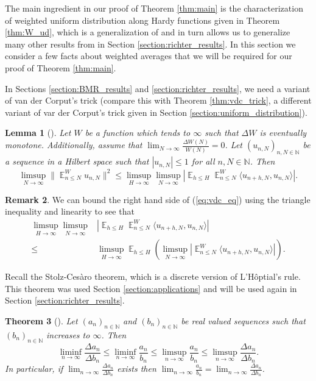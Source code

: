 \documentclass[12pt]{article}
\theoremstyle{plain} %
\newtheorem{theorem}{Theorem}[section]
\newtheorem{lemma}[theorem]{Lemma}
\theoremstyle{definition} %
\newtheorem{remark}[theorem]{Remark}
\theoremstyle{plain}
\theoremstyle{plain}
\numberwithin{equation}{section}
\newcommand{\Cesaro}{Ces\`{a}ro }
\newcommand{\N}{\mathbb{N}}
\renewcommand{\leq}{\leqslant}
\newcommand{\1}{\mathbbm{1}}
\newcommand{\E}{\operatorname{\mathbb{E}}}
\newcommand{\oo}{\infty}
\begin{document}
The main ingredient in our proof of Theorem \ref{thm:main} is the  characterization of weighted uniform distribution along Hardy functions given in Theorem \ref{thm:W_ud}, which is a generalization of \cite[Theorem 5.1]{Richter23} and in turn allows us to generalize many other results from \cite{Richter23} in Section \ref{section:richter_results}. In this section we consider a few facts about weighted averages that we will be required for our proof of Theorem \ref{thm:main}.


In Sections \ref{section:BMR_results} and \ref{section:richter_results}, we need a variant of van der Corput's trick (compare this with Theorem \ref{thm:vdc_trick}, a different variant of var der Corput's trick given in Section \ref{section:uniform_distribution}).

\begin{lemma}[{\cite[Lemma 4.6]{BMR24}}]\label{lem:vdc}
Let $W$ be a function which tends to $\oo$ such that $\Delta W$ is eventually monotone. Additionally, assume that $\lim_{N\to\oo}\frac{\Delta W(N)}{W(N)}=0$. Let $(u_{n,N})_{n,N\in \N}$ be a sequence in a Hilbert space such that $|u_{n,N}|\leq 1$ for all $n,N\in \N$. Then
\begin{equation}\label{eq:vdc_eq}
    \limsup_{N\to\oo}\|\E_{n\leq N}^Wu_{n,N}\|^2 \leq \limsup_{H\to\oo}\limsup_{N\to\oo}\left|\E_{h\leq H}\E_{n\leq N}^W\langle u_{n+h,N},u_{n,N}\rangle\right|.
\end{equation}

\end{lemma}
\begin{remark}\label{remark:vdc}
    We can bound the right hand side of (\ref{eq:vdc_eq}) using the triangle inequality and linearity to see that
\begin{align*}\label{eq:vdc_eq_2}
\limsup_{H\to\oo}\limsup_{N\to\oo}&\left|\E_{h\leq H}\E_{n\leq N}^W\langle u_{n+h,N},u_{n,N}\rangle\right|\\\leq& \limsup_{H\to\oo}\E_{h\leq H}\left(\limsup_{N\to\oo}\left|\E_{n\leq N}^W\langle u_{n+h,N},u_{n,N}\rangle\right|\right).
\end{align*}
\end{remark}

Recall the Stolz-\Cesaro theorem, which is a discrete version of L'H\^optial's rule. This theorem was used Section \ref{section:applications} and will be used again in Section \ref{section:richter_results}. 
\begin{theorem}[{\cite[Problem 70]{Polya_Szego}}]\label{thm:stolz_cesaro}
Let $(a_n)_{n\in \N}$ and $(b_n)_{n\in \N}$ be real valued sequences such that $(b_n)_{n\in \N}$ increases to $\oo$. Then
\begin{equation}\label{eq:stolz_cesaro_derivative}
    \liminf_{n\to\oo}\frac{\Delta a_n}{\Delta b_n}\leq \liminf_{n\to\oo}\frac{a_n}{b_n}\leq \limsup_{n\to\oo}\frac{a_n}{b_n}\leq \limsup_{n\to\oo}\frac{\Delta a_n}{\Delta b_n}.
\end{equation}
In particular, if $\lim_{n\to\oo}\frac{\Delta a_n}{\Delta b_n}$ exists then $\lim_{n\to\oo}\frac{ a_n}{ b_n}=\lim_{n\to\oo}\frac{\Delta a_n}{\Delta b_n}$.
\end{theorem}
 
\end{document}
